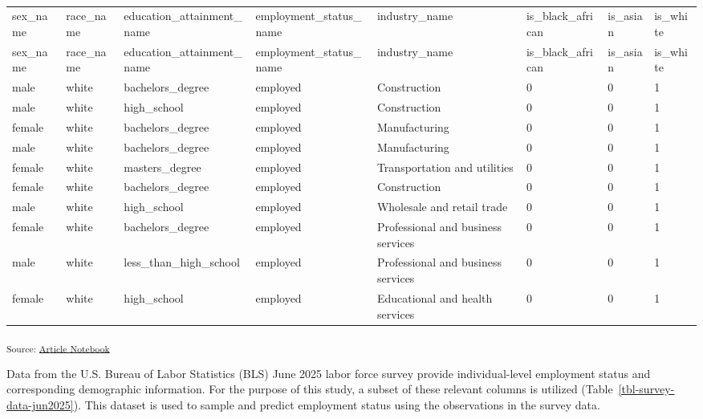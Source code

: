 \documentclass[
]{agujournal2019}
\begin{document}
\begin{longtable}[]{@{}llllllll@{}}

\caption{\label{tbl-survey-data-jun2025}BLS June 2025 Labor Force Survey
Data}

\tabularnewline

\caption{}\label{T_51442}\tabularnewline
\toprule\noalign{}
sex\_name & race\_name & education\_attainment\_name &
employment\_status\_name & industry\_name & is\_black\_african &
is\_asian & is\_white \\
\midrule\noalign{}
\endfirsthead
\toprule\noalign{}
sex\_name & race\_name & education\_attainment\_name &
employment\_status\_name & industry\_name & is\_black\_african &
is\_asian & is\_white \\
\midrule\noalign{}
\endhead
\bottomrule\noalign{}
\endlastfoot
male & white & bachelors\_degree & employed & Construction & 0 & 0 &
1 \\
male & white & high\_school & employed & Construction & 0 & 0 & 1 \\
female & white & bachelors\_degree & employed & Manufacturing & 0 & 0 &
1 \\
male & white & bachelors\_degree & employed & Manufacturing & 0 & 0 &
1 \\
female & white & masters\_degree & employed & Transportation and
utilities & 0 & 0 & 1 \\
female & white & bachelors\_degree & employed & Construction & 0 & 0 &
1 \\
male & white & high\_school & employed & Wholesale and retail trade & 0
& 0 & 1 \\
female & white & bachelors\_degree & employed & Professional and
business services & 0 & 0 & 1 \\
male & white & less\_than\_high\_school & employed & Professional and
business services & 0 & 0 & 1 \\
female & white & high\_school & employed & Educational and health
services & 0 & 0 & 1 \\

\end{longtable}

\textsubscript{Source:
\href{https://mw1296.github.io/dsan5650_social_causal_inference/index.qmd.html}{Article
Notebook}}

Data from the U.S. Bureau of Labor Statistics (BLS) June 2025 labor
force survey provide individual-level employment status and
corresponding demographic information. For the purpose of this study, a
subset of these relevant columns is utilized
(Table~\ref{tbl-survey-data-jun2025}). This dataset is used to sample
and predict employment status using the observations in the survey data.
\end{document}
